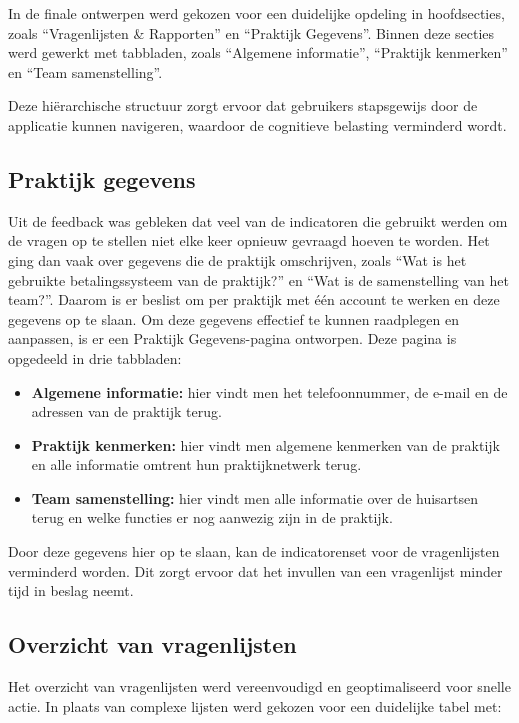In de finale ontwerpen werd gekozen voor een duidelijke opdeling in hoofdsecties, zoals ``Vragenlijsten \& Rapporten'' en ``Praktijk Gegevens''.
Binnen deze secties werd gewerkt met tabbladen, zoals ``Algemene informatie'', ``Praktijk kenmerken'' en ``Team samenstelling''.
\medskip
 
Deze hiërarchische structuur zorgt ervoor dat gebruikers stapsgewijs door de applicatie kunnen navigeren, waardoor de cognitieve belasting verminderd wordt.

\subsection{Praktijk gegevens}
\label{subsec:praktijkgegevens}

Uit de feedback was gebleken dat veel van de indicatoren die gebruikt werden om de vragen op te stellen niet elke keer opnieuw gevraagd hoeven te worden.
Het ging dan vaak over gegevens die de praktijk omschrijven, zoals ``Wat is het gebruikte betalingssysteem van de praktijk?'' en ``Wat is de samenstelling van het team?''.
Daarom is er beslist om per praktijk met één account te werken en deze gegevens op te slaan.
Om deze gegevens effectief te kunnen raadplegen en aanpassen, is er een Praktijk Gegevens-pagina ontworpen.
Deze pagina is opgedeeld in drie tabbladen:
 
\begin{itemize}
    \item \textbf{Algemene informatie:} hier vindt men het telefoonnummer, de e-mail en de adressen van de praktijk terug.
    \item \textbf{Praktijk kenmerken:} hier vindt men algemene kenmerken van de praktijk en alle informatie omtrent hun praktijknetwerk terug.
    \item \textbf{Team samenstelling:} hier vindt men alle informatie over de huisartsen terug en welke functies er nog aanwezig zijn in de praktijk.
\end{itemize}
 
Door deze gegevens hier op te slaan, kan de indicatorenset voor de vragenlijsten verminderd worden.
Dit zorgt ervoor dat het invullen van een vragenlijst minder tijd in beslag neemt.
 

\subsection{Overzicht van vragenlijsten}
\label{subsec:vragenlijsten}

Het overzicht van vragenlijsten werd vereenvoudigd en geoptimaliseerd voor snelle actie.
In plaats van complexe lijsten werd gekozen voor een duidelijke tabel met:
 
